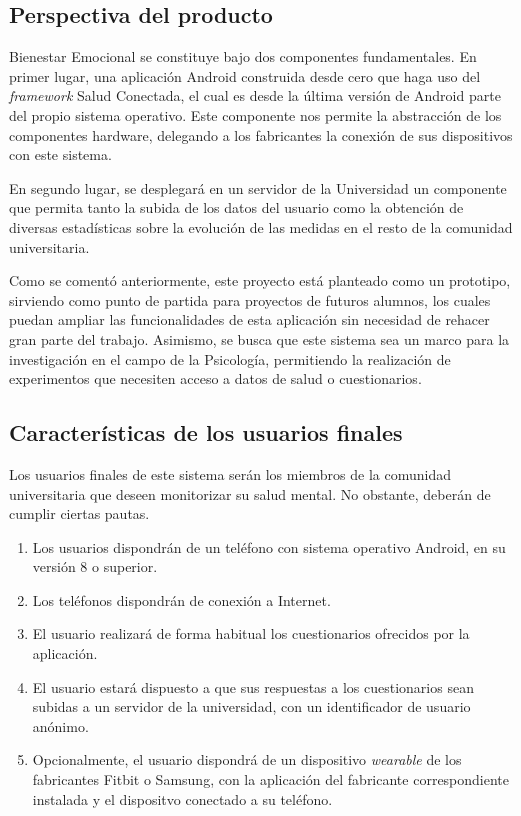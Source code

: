     \subsection{Perspectiva del producto}
        Bienestar Emocional se constituye bajo dos componentes fundamentales. En primer lugar, una aplicación Android construida desde cero que haga uso del \textit{framework} Salud Conectada, el cual es desde la última versión de Android parte del propio sistema operativo. Este componente nos permite la abstracción de los componentes hardware, delegando a los fabricantes la conexión de sus dispositivos con este sistema.

        En segundo lugar, se desplegará en un servidor de la Universidad un componente que permita tanto la subida de los datos del usuario como la obtención de diversas estadísticas sobre la evolución de las medidas en el resto de la comunidad universitaria.

        Como se comentó anteriormente, este proyecto está planteado como un prototipo, sirviendo como punto de partida para proyectos de futuros alumnos, los cuales puedan ampliar las funcionalidades de esta aplicación sin necesidad de rehacer gran parte del trabajo. Asimismo, se busca que este sistema sea un marco para la investigación en el campo de la Psicología, permitiendo la realización de experimentos que necesiten acceso a datos de salud o cuestionarios.


    \subsection{Características de los usuarios finales}


    Los usuarios finales de este sistema serán los miembros de la comunidad universitaria que deseen monitorizar su salud mental. No obstante, deberán de cumplir ciertas pautas.
    
    \begin{enumerate}
        \item Los usuarios dispondrán de un teléfono con sistema operativo Android, en su versión 8 o superior.
        \item Los teléfonos dispondrán de conexión a Internet.
        \item El usuario realizará de forma habitual los cuestionarios ofrecidos por la aplicación.
        \item El usuario estará dispuesto a que sus respuestas a los cuestionarios sean subidas a un servidor de la universidad, con un identificador de usuario anónimo.
        \item Opcionalmente, el usuario dispondrá de un dispositivo \textit{wearable} de los fabricantes Fitbit o Samsung, con la aplicación del fabricante correspondiente instalada y el dispositvo conectado a su teléfono.
        
    \end{enumerate}
        
